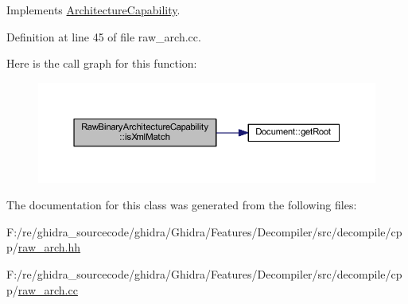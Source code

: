 Implements \mbox{\hyperlink{class_architecture_capability_a653243b342d480273e0f04f7194094b8}{Architecture\+Capability}}.



Definition at line 45 of file raw\+\_\+arch.\+cc.

Here is the call graph for this function\+:
\nopagebreak
\begin{figure}[H]
\begin{center}
\leavevmode
\includegraphics[width=350pt]{class_raw_binary_architecture_capability_ad26a1a35fec33c5952a3f499dc0e43db_cgraph}
\end{center}
\end{figure}


The documentation for this class was generated from the following files\+:\begin{DoxyCompactItemize}
\item 
F\+:/re/ghidra\+\_\+sourcecode/ghidra/\+Ghidra/\+Features/\+Decompiler/src/decompile/cpp/\mbox{\hyperlink{raw__arch_8hh}{raw\+\_\+arch.\+hh}}\item 
F\+:/re/ghidra\+\_\+sourcecode/ghidra/\+Ghidra/\+Features/\+Decompiler/src/decompile/cpp/\mbox{\hyperlink{raw__arch_8cc}{raw\+\_\+arch.\+cc}}\end{DoxyCompactItemize}
